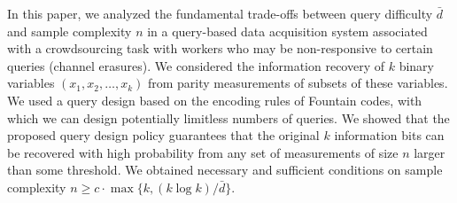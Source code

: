 \documentclass[11pt,onecolumn]{IEEEtran}
\newcommand{\bard}{\bar{d}}
\begin{document}
In this paper, we analyzed the fundamental trade-offs between query difficulty $\bard$ and sample complexity $n$ in a query-based data acquisition system associated with  a crowdsourcing task with workers who may be non-responsive to certain queries (channel erasures).
We considered the information recovery of $k$ binary variables $(x_1,x_2,\dots, x_k)$ from parity measurements of subsets of these variables. 
We used a query design based on the encoding rules of Fountain codes, with which we can design potentially limitless numbers of queries. We showed that the proposed query design policy  guarantees that the original $k$ information bits can be recovered with high probability from any set of measurements of size $n$ larger than some threshold.
We obtained necessary and sufficient conditions on sample complexity $n\geq c\cdot \max\{k, (k\log k)/\bard\}$. %
\end{document}
